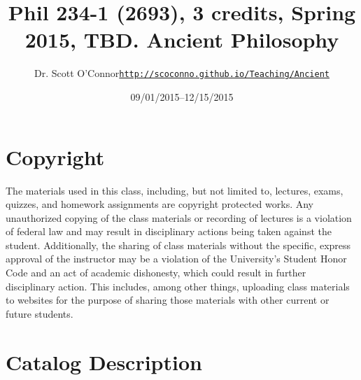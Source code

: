 \documentclass[article,oneside]{memoir}
\def\myauthor{Author}
\def\mytitle{Title}
\def\mycopyright{\myauthor}
\def\myweb{\href{http://scoconno.github.io/Teaching/Ancient}{http://scoconno.github.io/Teaching/Ancient}}
\def\myauthor{Dr. Scott O'Connor}
\def\mytitle{{\normalsize Phil 234-1 (2693), 3 credits, Spring 2015, TBD. \newline} \HUGE Ancient Philosophy}
\begin{document}
\setsansfont[Mapping=tex-text]{Minion Pro} 
\setmonofont[Mapping=tex-text,Scale=0.8]{Minion Pro} 

\def\ind{\hangindent=1 true cm\hangafter=1 \noindent}
\def\labelitemi{$\cdot$}


\title{\LARGE \mytitle}     
\author{\Large\myauthor \newline \footnotesize\texttt{\noindent\myweb}}
\date{09/01/2015--12/15/2015}

\published{\today}

\maketitle




%
%

\section{Copyright}
The materials used in this class, including, but not limited to, lectures, exams, quizzes, and homework assignments are copyright protected works.  Any unauthorized copying of the class materials or recording of lectures is a violation of federal law and may result in disciplinary actions being taken against the student.  Additionally, the sharing of class materials without the specific, express approval of the instructor may be a violation of the University's Student Honor Code and an act of academic dishonesty, which could result in further disciplinary action.  This includes, among other things, uploading class materials to websites for the purpose of sharing those materials with other current or future students. 

\section{Catalog Description}
\end{document}

